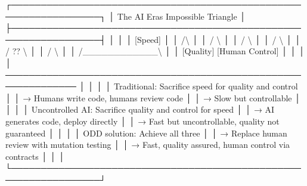 \documentclass[
]{article}
\newenvironment{Shaded}{}{}
\newcommand{\NormalTok}[1]{#1}
\begin{document}
\begin{Shaded}
\begin{Highlighting}[]
\NormalTok{┌─────────────────────────────────────────────────────────────────┐}
\NormalTok{│              The AI Era\textquotesingle{}s Impossible Triangle                    │}
\NormalTok{├─────────────────────────────────────────────────────────────────┤}
\NormalTok{│                                                                  │}
\NormalTok{│                      [Speed]                                    │}
\NormalTok{│                       /\textbackslash{}                                         │}
\NormalTok{│                      /  \textbackslash{}                                        │}
\NormalTok{│                     /    \textbackslash{}                                       │}
\NormalTok{│                    /      \textbackslash{}                                      │}
\NormalTok{│                   /   ??   \textbackslash{}                                     │}
\NormalTok{│                  /          \textbackslash{}                                    │}
\NormalTok{│                 /\_\_\_\_\_\_\_\_\_\_\_\_\textbackslash{}                                   │}
\NormalTok{│            [Quality]      [Human Control]                       │}
\NormalTok{│                                                                  │}
\NormalTok{│  ──────────────────────────────────────────────────────────────  │}
\NormalTok{│                                                                  │}
\NormalTok{│  Traditional: Sacrifice speed for quality and control           │}
\NormalTok{│  → Humans write code, humans review code                        │}
\NormalTok{│  → Slow but controllable                                        │}
\NormalTok{│                                                                  │}
\NormalTok{│  Uncontrolled AI: Sacrifice quality and control for speed       │}
\NormalTok{│  → AI generates code, deploy directly                           │}
\NormalTok{│  → Fast but uncontrollable, quality not guaranteed              │}
\NormalTok{│                                                                  │}
\NormalTok{│  ODD solution: Achieve all three                                │}
\NormalTok{│  → Replace human review with mutation testing                   │}
\NormalTok{│  → Fast, quality assured, human control via contracts           │}
\NormalTok{│                                                                  │}
\NormalTok{└─────────────────────────────────────────────────────────────────┘}
\end{Highlighting}
\end{Shaded}
\end{document}
